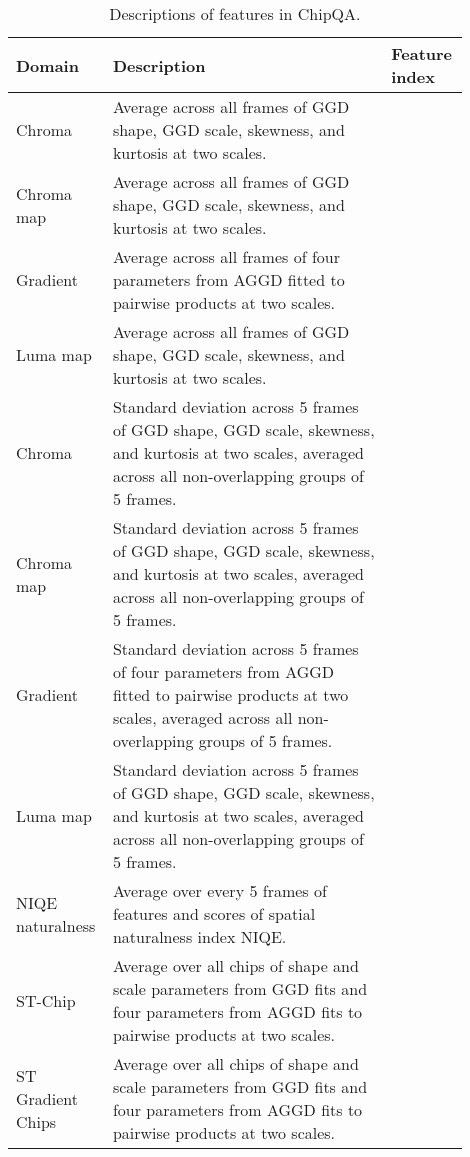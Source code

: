 \documentclass[journal]{IEEEtran}
\begin{document}
\begin{table*}
\caption{Descriptions of features in ChipQA.}
\begin{center}
\begin{tabular}{|p{0.15\linewidth} | p{0.6\linewidth}|p{0.15\linewidth}|}
\hline
Domain &  Description & Feature index\\
\hline
Chroma & Average across all frames of GGD shape, GGD scale, skewness, and kurtosis at two scales. &  \\
\hline
Chroma  map & Average across all frames of GGD shape, GGD scale, skewness, and kurtosis at two scales. &  \\
\hline
Gradient &  Average across all frames of four parameters from AGGD fitted to pairwise products at two scales. &  \\
\hline
Luma  map &  Average across all frames of GGD shape, GGD scale, skewness, and kurtosis at two scales. &  \\
\hline
Chroma & Standard deviation across 5 frames of GGD shape, GGD scale, skewness, and kurtosis at two scales, averaged across all non-overlapping groups of 5 frames. &  \\
\hline
Chroma  map &  Standard deviation across 5 frames of GGD shape, GGD scale, skewness, and kurtosis at two scales, averaged across all non-overlapping groups of 5 frames. &  \\
\hline
Gradient &  Standard deviation across 5 frames of four parameters from AGGD fitted to pairwise products at two scales, averaged across all non-overlapping groups of 5 frames. &  \\
\hline
Luma  map &  Standard deviation across 5 frames of GGD shape, GGD scale, skewness, and kurtosis at two scales, averaged across all non-overlapping groups of 5 frames. &  \\
\hline
NIQE naturalness & Average over every 5 frames of features and scores of spatial naturalness index NIQE. &  \\
\hline
ST-Chip &  Average over all chips of shape and scale parameters from GGD fits and four parameters from AGGD fits to pairwise products at two scales. &  \\
\hline
ST Gradient Chips &  Average over all chips of shape and scale parameters from GGD fits and four parameters from AGGD fits to pairwise products at two scales. &  \\
\hline
\end{tabular}
\label{feat}
\end{center}
\vspace{-10mm}
\end{table*}
\end{document}
